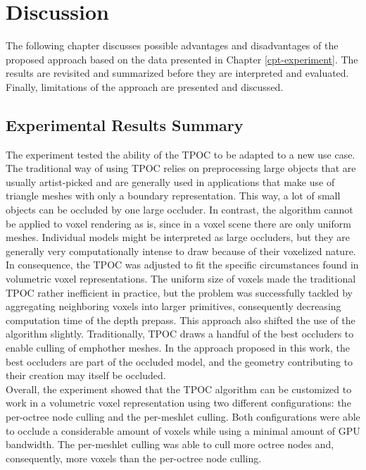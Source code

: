 \chapter{Discussion} \label{cpt-discussion}

The following chapter discusses possible advantages and disadvantages of the proposed approach based on 
the data presented in Chapter \ref{cpt-experiment}. The results are revisited and summarized before they 
are interpreted and evaluated. Finally, limitations of the approach are presented and discussed.

\section{Experimental Results Summary}

The experiment tested the ability of the \ac{TPOC} to be adapted to a new use case. The traditional way of 
using \ac{TPOC} relies on preprocessing large objects that are usually artist-picked and are generally used 
in applications that make use of triangle meshes with only a boundary representation. This way, a lot of 
small objects can be occluded by one large occluder. In contrast, the algorithm cannot be applied to voxel 
rendering as is, since in a voxel scene there are only uniform meshes. Individual models might be interpreted 
as large occluders, but they are generally very computationally intense to draw because of their voxelized 
nature. \\

\noindent
In consequence, the \ac{TPOC} was adjusted to fit the specific circumstances found in volumetric voxel representations. 
The uniform size of voxels made the traditional \ac{TPOC} rather inefficient in practice, but the problem was 
successfully tackled by aggregating neighboring voxels into larger primitives, consequently decreasing computation 
time of the depth prepass. This approach also shifted the use of the algorithm slightly. Traditionally, \ac{TPOC} 
draws a handful of the best occluders to enable culling of emph{other} meshes. In the approach proposed in this work, 
the best occluders are part of the occluded model, and the geometry contributing to their creation may itself be 
occluded. \\

\noindent
Overall, the experiment showed that the \ac{TPOC} algorithm can be customized to work in a volumetric voxel 
representation using two different configurations: the per-octree node culling and the per-meshlet culling. 
Both configurations were able to occlude a considerable amount of voxels while using a minimal amount of 
\ac{GPU} bandwidth. The per-meshlet culling was able to cull more octree nodes and, consequently, more 
voxels than the per-octree node culling. \\

